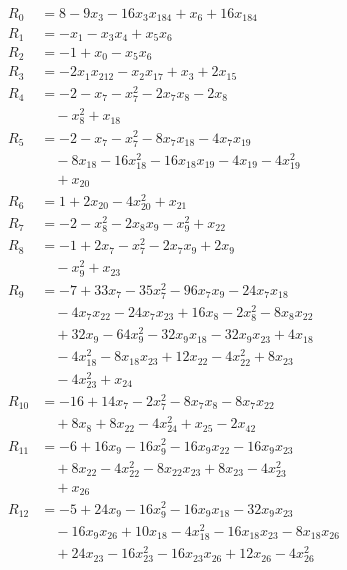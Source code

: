 \begingroup\small
\setlength{\jot}{1.5pt}
\begin{align*}
R_{0} &= 8 -9x_{3} -16x_{3}x_{184} +x_{6} +16x_{184}\\
R_{1} &= -x_{1} -x_{3}x_{4} +x_{5}x_{6}\\
R_{2} &= -1 +x_{0} -x_{5}x_{6}\\
R_{3} &= -2x_{1}x_{212} -x_{2}x_{17} +x_{3} +2x_{15}\\
R_{4} &= -2 -x_{7} -x_{7}^{2} -2x_{7}x_{8} -2x_{8}\\
&\quad -x_{8}^{2} +x_{18}\\
R_{5} &= -2 -x_{7} -x_{7}^{2} -8x_{7}x_{18} -4x_{7}x_{19}\\
&\quad -8x_{18} -16x_{18}^{2} -16x_{18}x_{19} -4x_{19} -4x_{19}^{2}\\
&\quad +x_{20}\\
R_{6} &= 1 +2x_{20} -4x_{20}^{2} +x_{21}\\
R_{7} &= -2 -x_{8}^{2} -2x_{8}x_{9} -x_{9}^{2} +x_{22}\\
R_{8} &= -1 +2x_{7} -x_{7}^{2} -2x_{7}x_{9} +2x_{9}\\
&\quad -x_{9}^{2} +x_{23}\\
R_{9} &= -7 +33x_{7} -35x_{7}^{2} -96x_{7}x_{9} -24x_{7}x_{18}\\
&\quad -4x_{7}x_{22} -24x_{7}x_{23} +16x_{8} -2x_{8}^{2} -8x_{8}x_{22}\\
&\quad +32x_{9} -64x_{9}^{2} -32x_{9}x_{18} -32x_{9}x_{23} +4x_{18}\\
&\quad -4x_{18}^{2} -8x_{18}x_{23} +12x_{22} -4x_{22}^{2} +8x_{23}\\
&\quad -4x_{23}^{2} +x_{24}\\
R_{10} &= -16 +14x_{7} -2x_{7}^{2} -8x_{7}x_{8} -8x_{7}x_{22}\\
&\quad +8x_{8} +8x_{22} -4x_{24}^{2} +x_{25} -2x_{42}\\
R_{11} &= -6 +16x_{9} -16x_{9}^{2} -16x_{9}x_{22} -16x_{9}x_{23}\\
&\quad +8x_{22} -4x_{22}^{2} -8x_{22}x_{23} +8x_{23} -4x_{23}^{2}\\
&\quad +x_{26}\\
R_{12} &= -5 +24x_{9} -16x_{9}^{2} -16x_{9}x_{18} -32x_{9}x_{23}\\
&\quad -16x_{9}x_{26} +10x_{18} -4x_{18}^{2} -16x_{18}x_{23} -8x_{18}x_{26}\\
&\quad +24x_{23} -16x_{23}^{2} -16x_{23}x_{26} +12x_{26} -4x_{26}^{2}\\

\end{align*}
